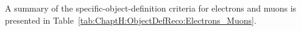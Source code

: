 A summary of the specific-object-definition criteria for electrons and muons is presented in Table~\ref{tab:ChaptH:ObjectDefReco:Electrons_Muons}.

\begin{comment}
The selection criteria for muons are summarised in the right column of Table~\ref{tab:ChaptH:ObjectDefReco:Electrons_Muons}.
Following the recommendations, preselected muons used for the overlap-removal process must satisfy: $\pt > 10$~GeV, $|\eta| < 2.5$, 
and the \texttt{medium} identification criteria. %
This \texttt{medium} working point imposes conditions on the number of hits in the ID and MS subsystems, as well as 
on the significance of the charge-to-momentum ratio ($q/p$)~\cite{PERF-2015-10, MUON-2018-03,twiki-MuonSelection}. 
If a muon is flagged as ``bad'' due to insufficient momentum resolution, the entire event is removed,
following the recommendations~\cite{twiki-MuonSelection}.
In addition to the criteria for preselected muons, muons selected for analysis regions are subject 
to the \texttt{PLImprovedTight} isolation requirement. This isolation criterion is applied to suppress 
contributions from misidentified or non-prompt muons~\cite{ATLAS:2022swp, ATLAS:2016lqx}. %

The recommended cuts for the longitudinal impact parameter and transverse 
impact parameter (d0) are applied to muon candidates. The reconstructed track 
associated with the muon must satisfy $|\zzsth| < 0.5\,$mm and $|\dzero| / \sigma(\dzero) < 3$. 
scale factors for muon identification and isolation are applied as multiplicative factors to the MC-event weight. 
These scale factors correct for the differences in efficiency between data and MC simulations. 
The details of these corrections can be found in the References~\cite{PERF-2015-10}.


\end{comment}

